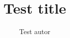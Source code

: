 \documentclass[class=scrartcl,crop=false]{standalone}
\title{Test title}
\author{Test autor}
\begin{document}
\makeatletter

\begin{center}
    \vspace*{3cm}

    {\huge \textbf{\@title}}

    \vspace*{0.5cm}

    {\Large \textbf{}}

    {\Large \@date}

    \vspace*{2cm}

    {\Large \@author}

    \vspace*{7cm}

    {\Large } %

    {\Large } %

\end{center}

\makeatother
\end{document}
